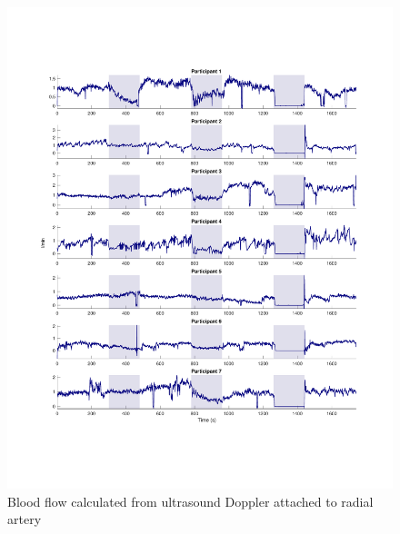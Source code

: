 \begin{figure}[!htbp]
	\includegraphics[width=\textwidth,height=\textheight,keepaspectratio]{figure16}    
	\caption{Blood flow calculated from ultrasound Doppler attached to radial artery}
	\label{fig:blood_flow_Doppler}
\end{figure}

